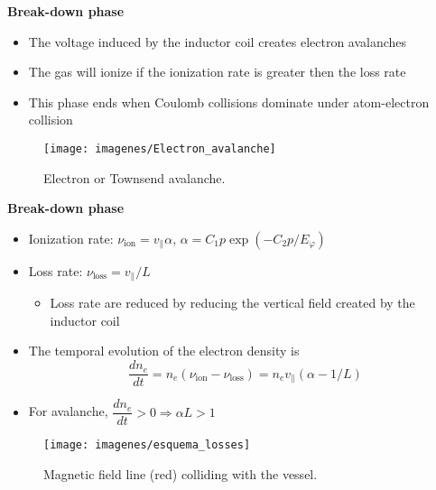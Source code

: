 \documentclass[10pt]{beamer}
\begin{document}
\begin{frame}{\bf Break-down phase}
	\begin{minipage}{0.45\textwidth}
		\begin{itemize}
			\item The voltage induced by the inductor coil creates electron avalanches
			\item The gas will ionize if the ionization rate is greater then the loss rate
			\item This phase ends when Coulomb collisions dominate under atom-electron collision
		\end{itemize}
	\end{minipage}
	\hfill
	\begin{minipage}{0.5\textwidth}
		\begin{figure}
		\centering
		\texttt{[image: imagenes/Electron\_avalanche]}
		\caption{Electron or Townsend avalanche.}
		\end{figure}
	\end{minipage}
	\end{frame}

\begin{frame}{\bf Break-down phase}
	\begin{minipage}{0.45\textwidth}
		\begin{itemize}
			\item Ionization rate: $\nu_\text{ion}=v_\parallel \alpha$, $ \alpha = C_1 p \exp (-C_2 p/E_\varphi) $
			\item Loss rate: $\nu_\text{loss}=v_\parallel /L$
			\begin{itemize}
					\item Loss rate are reduced by reducing the vertical field created by the inductor coil
			\end{itemize}

			\item The temporal evolution of the electron density is
			\begin{equation} %
\dfrac{d n_e}{dt}=n_e(\nu_\text{ion}-\nu_\text{loss})=n_e v_{\parallel}(\alpha-1/L)
			\end{equation}
			\item For avalanche, $\dfrac{d n_e}{dt}>0 \Rightarrow \alpha L>1$
		\end{itemize}
	\end{minipage}
	\hfill
	\begin{minipage}{0.45\textwidth}
		\begin{figure}
		\centering
		\texttt{[image: imagenes/esquema\_losses]}

		\caption{Magnetic field line (red) colliding with the vessel.}
		\end{figure}
	\end{minipage}
\end{frame}
\end{document}
